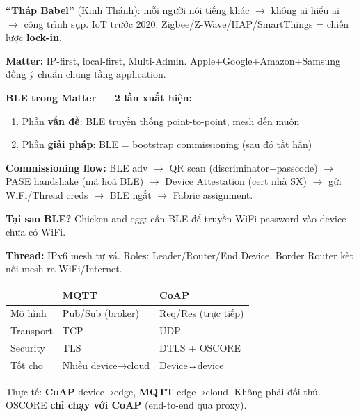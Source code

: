 \documentclass[9pt,a4paper,twocolumn]{article}
\begin{document}
\begin{tcolorbox}[weekbox, title={W4 --- Matter, Thread, MQTT, CoAP}]

\textbf{``Tháp Babel''} (Kinh Thánh): mỗi người nói tiếng khác $\rightarrow$ không ai hiểu ai $\rightarrow$ công trình sụp.
IoT trước 2020: Zigbee/Z-Wave/HAP/SmartThings = chiến lược \textbf{lock-in}.

\textbf{Matter:} IP-first, local-first, Multi-Admin.
Apple+Google+Amazon+Samsung đồng ý chuẩn chung tầng application.

\textbf{BLE trong Matter --- 2 lần xuất hiện:}
\begin{enumerate}
  \item Phần \textbf{vấn đề}: BLE truyền thống point-to-point, mesh đến muộn
  \item Phần \textbf{giải pháp}: BLE = bootstrap commissioning (sau đó tắt hẳn)
\end{enumerate}

\textbf{Commissioning flow:} BLE adv $\rightarrow$ QR scan (discriminator+passcode)
$\rightarrow$ PASE handshake (mã hoá BLE) $\rightarrow$ Device Attestation (cert nhà SX)
$\rightarrow$ gửi WiFi/Thread creds $\rightarrow$ BLE ngắt $\rightarrow$ Fabric assignment.

\textbf{Tại sao BLE?} Chicken-and-egg: cần BLE để truyền WiFi password vào device chưa có WiFi.

\textbf{Thread:} IPv6 mesh tự vá. Roles: Leader/Router/End Device.
Border Router kết nối mesh ra WiFi/Internet.

\vspace{3pt}
\begin{tabular}{@{}p{1.5cm}p{1.8cm}p{2.1cm}@{}}
\toprule
\scriptsize & \scriptsize MQTT & \scriptsize CoAP \\
\midrule
\scriptsize Mô hình & \scriptsize Pub/Sub (broker) & \scriptsize Req/Res (trực tiếp) \\
\scriptsize Transport & \scriptsize TCP & \scriptsize UDP \\
\scriptsize Security & \scriptsize TLS & \scriptsize DTLS + OSCORE \\
\scriptsize Tốt cho & \scriptsize Nhiều device→cloud & \scriptsize Device↔device \\
\bottomrule
\end{tabular}

\vspace{2pt}
Thực tế: \textbf{CoAP} device→edge, \textbf{MQTT} edge→cloud. Không phải đối thủ.
OSCORE \textbf{chỉ chạy với CoAP} (end-to-end qua proxy).

\end{tcolorbox}
\end{document}
